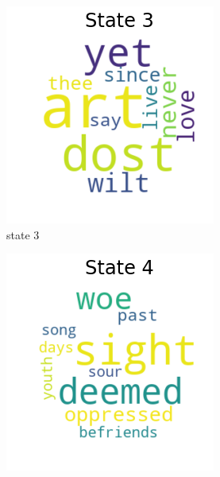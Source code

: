 \begin{figure}[H]
	\bigskip 
	
	\begin{subfigure}[t]{0.3\textwidth}
		\includegraphics[width=\textwidth]{download(3).png}
		\caption{state 3}
	\end{subfigure}%
	\begin{subfigure}[t]{0.3\textwidth}
		\includegraphics[width=\textwidth]{download(4).png}

\end{subfigure}
\end{figure}
